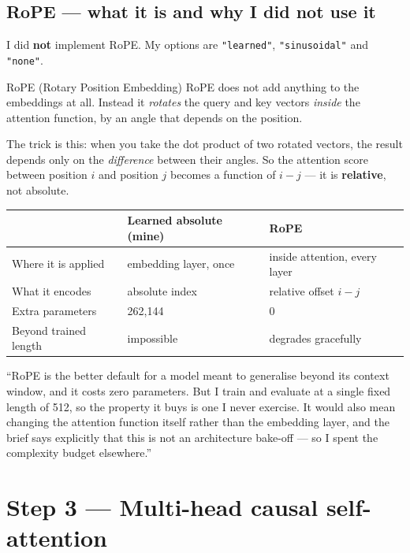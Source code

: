 \documentclass[11pt]{report}
\newcommand{\p}[1]{\texttt{#1}}
\begin{document}
\subsection{RoPE --- what it is and why I did not use it}

\begin{warnbox}
I did \textbf{not} implement RoPE. My options are \p{"learned"},
\p{"sinusoidal"} and \p{"none"}.
\end{warnbox}

\begin{concept}{RoPE (Rotary Position Embedding)}
RoPE does not add anything to the embeddings at all. Instead it \emph{rotates}
the query and key vectors \emph{inside} the attention function, by an angle
that depends on the position.

The trick is this: when you take the dot product of two rotated vectors, the
result depends only on the \emph{difference} between their angles. So the
attention score between position $i$ and position $j$ becomes a function of
$i - j$ --- it is \textbf{relative}, not absolute.
\end{concept}

\begin{center}
\begin{tabular}{@{}lll@{}}
\toprule
 & \textbf{Learned absolute (mine)} & \textbf{RoPE} \\
\midrule
Where it is applied & embedding layer, once & inside attention, every layer \\
What it encodes & absolute index & relative offset $i-j$ \\
Extra parameters & 262,144 & 0 \\
Beyond trained length & impossible & degrades gracefully \\
\bottomrule
\end{tabular}
\end{center}

\begin{saybox}
``RoPE is the better default for a model meant to generalise beyond its context
window, and it costs zero parameters. But I train and evaluate at a single fixed
length of 512, so the property it buys is one I never exercise. It would also
mean changing the attention function itself rather than the embedding layer, and
the brief says explicitly that this is not an architecture bake-off --- so I
spent the complexity budget elsewhere.''
\end{saybox}

\section{Step 3 --- Multi-head causal self-attention}
\end{document}
